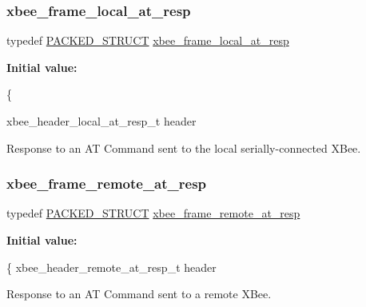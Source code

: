 \subsubsection{\texorpdfstring{xbee\+\_\+frame\+\_\+local\+\_\+at\+\_\+resp}{xbee\_frame\_local\_at\_resp}}
{\footnotesize\ttfamily typedef \hyperlink{group___s_x_a_ga4233297bd31be5c273d4fb0758cc54d7}{P\+A\+C\+K\+E\+D\+\_\+\+S\+T\+R\+U\+CT} \hyperlink{group__xbee__atcmd_ga8e4eb20c6debd4dfac4a8a81d9314e98}{xbee\+\_\+frame\+\_\+local\+\_\+at\+\_\+resp}}

{\bfseries Initial value\+:}
\begin{DoxyCode}
\{

   xbee\_header\_local\_at\_resp\_t header
\end{DoxyCode}


Response to an AT Command sent to the local serially-\/connected X\+Bee. 

\mbox{\label{group__xbee__atcmd_ga5c11edcb9c5f6b11eec5d5d1c37cfbfd}} 
\subsubsection{\texorpdfstring{xbee\+\_\+frame\+\_\+remote\+\_\+at\+\_\+resp}{xbee\_frame\_remote\_at\_resp}}
{\footnotesize\ttfamily typedef \hyperlink{group___s_x_a_ga4233297bd31be5c273d4fb0758cc54d7}{P\+A\+C\+K\+E\+D\+\_\+\+S\+T\+R\+U\+CT} \hyperlink{group__xbee__atcmd_ga5c11edcb9c5f6b11eec5d5d1c37cfbfd}{xbee\+\_\+frame\+\_\+remote\+\_\+at\+\_\+resp}}

{\bfseries Initial value\+:}
\begin{DoxyCode}
\{
   xbee\_header\_remote\_at\_resp\_t header
\end{DoxyCode}


Response to an AT Command sent to a remote X\+Bee. 

\mbox{\label{group__xbee__atcmd_ga9bf03869fc9022aadb223bfe0cbbce48}} 
